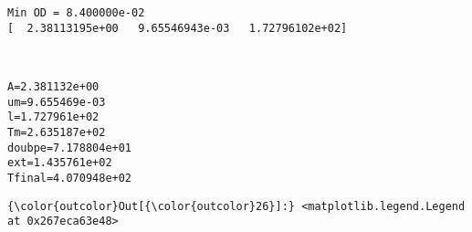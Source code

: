 \documentclass[11pt]{article}
\begin{document}
    \begin{Verbatim}[commandchars=\\\{\}]
Min OD = 8.400000e-02
[  2.38113195e+00   9.65546943e-03   1.72796102e+02]

    \end{Verbatim}

    \begin{center}
    \end{center}
    { \hspace*{\fill} \\}
    
    \begin{Verbatim}[commandchars=\\\{\}]
A=2.381132e+00
um=9.655469e-03
l=1.727961e+02
Tm=2.635187e+02
doubpe=7.178804e+01
ext=1.435761e+02
Tfinal=4.070948e+02

    \end{Verbatim}

            \begin{Verbatim}[commandchars=\\\{\}]
{\color{outcolor}Out[{\color{outcolor}26}]:} <matplotlib.legend.Legend at 0x267eca63e48>
\end{Verbatim}
        
    \begin{center}
    \end{center}
    { \hspace*{\fill} \\}
    
    \begin{center}
    \end{center}
    { \hspace*{\fill} \\}
    
\end{document}
